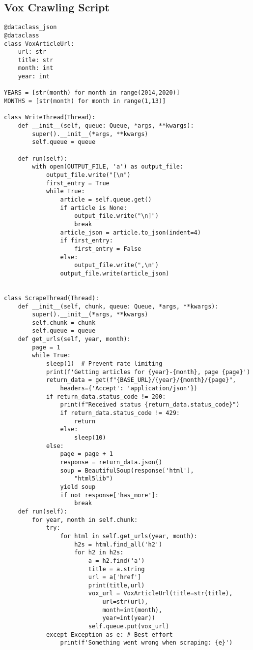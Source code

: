 \subsection{Vox Crawling Script}
\begin{verbatim}
@dataclass_json
@dataclass
class VoxArticleUrl:
    url: str
    title: str
    month: int
    year: int

YEARS = [str(month) for month in range(2014,2020)]
MONTHS = [str(month) for month in range(1,13)]

class WriteThread(Thread):
    def __init__(self, queue: Queue, *args, **kwargs):
        super().__init__(*args, **kwargs)
        self.queue = queue

    def run(self):
        with open(OUTPUT_FILE, 'a') as output_file:
            output_file.write("[\n")
            first_entry = True
            while True:
                article = self.queue.get()
                if article is None:
                    output_file.write("\n]")
                    break
                article_json = article.to_json(indent=4)
                if first_entry:
                    first_entry = False
                else:
                    output_file.write(",\n")
                output_file.write(article_json)


class ScrapeThread(Thread):
    def __init__(self, chunk, queue: Queue, *args, **kwargs):
        super().__init__(*args, **kwargs)
        self.chunk = chunk
        self.queue = queue
    def get_urls(self, year, month):
        page = 1
        while True:
            sleep(1)  # Prevent rate limiting
            print(f'Getting articles for {year}-{month}, page {page}')
            return_data = get(f"{BASE_URL}/{year}/{month}/{page}", 
                headers={'Accept': 'application/json'})
            if return_data.status_code != 200:
                print(f"Received status {return_data.status_code}")
                if return_data.status_code != 429:
                    return
                else:
                    sleep(10)
            else:
                page = page + 1
                response = return_data.json()
                soup = BeautifulSoup(response['html'], 
                    "html5lib")
                yield soup
                if not response['has_more']:
                    break
    def run(self):
        for year, month in self.chunk:
            try:
                for html in self.get_urls(year, month):
                    h2s = html.find_all('h2')
                    for h2 in h2s:
                        a = h2.find('a')
                        title = a.string
                        url = a['href']
                        print(title,url)
                        vox_url = VoxArticleUrl(title=str(title), 
                            url=str(url), 
                            month=int(month), 
                            year=int(year))
                        self.queue.put(vox_url)
            except Exception as e: # Best effort
                print(f'Something went wrong when scraping: {e}')
\end{verbatim}